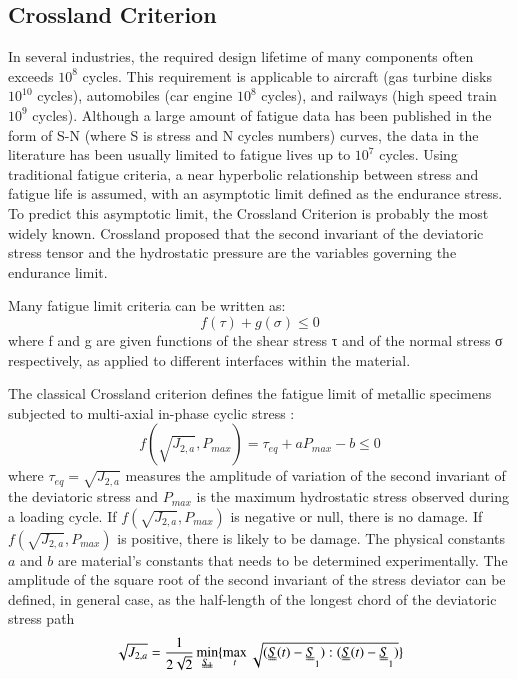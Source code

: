 \documentclass[3p,times,procedia,number]{elsarticle}
\begin{document}
\subsection{Crossland Criterion}
In several industries, the required design lifetime of many components often exceeds $ 10^8 $ cycles. This requirement is applicable to aircraft (gas turbine disks $ 10^{10} $ cycles), automobiles (car engine $ 10^8 $ cycles), and railways (high speed train $ 10^9 $ cycles). Although a large amount of fatigue data has been published in the form of S-N (where S is stress and N cycles numbers) curves, the data in the literature has been usually limited to fatigue lives up to $ 10^7 $ cycles. Using traditional fatigue criteria, a near hyperbolic relationship between stress and fatigue life is assumed, with an asymptotic limit defined as the endurance stress. To predict this asymptotic limit, the Crossland Criterion is probably the most widely known. Crossland proposed that the second invariant of the deviatoric stress tensor and the hydrostatic pressure are the variables governing the endurance limit. 

Many fatigue limit criteria can be written as:
\begin{equation}
	f(\tau)+g(\sigma) \leqslant 0
\end{equation}
where f and g are given functions of the shear stress τ and of the normal stress σ respectively, as applied to different interfaces within the material.  

The classical Crossland criterion defines the fatigue limit of metallic specimens subjected to multi-axial in-phase cyclic stress\cite{Crossland} : \begin{equation}f(\sqrt{J_{2,a}},P_{max})=\tau_{eq}+aP_{max}-b\leqslant 0\end{equation}
where $\tau_{eq}=\sqrt{J_{2,a}}$ measures  the amplitude of variation of the second invariant of the deviatoric stress  and $P_{max}$ is the maximum hydrostatic stress observed during a loading cycle. If $f(\sqrt{J_{2,a}},P_{max})$ is negative or null, there is no damage. If $f(\sqrt{J_{2,a}},P_{max})$ is positive, there is likely to be damage. The physical constants $a$ and $b$ are material's constants that needs to be determined experimentally. The amplitude of the square root of the second invariant of the stress deviator can be defined, in general case, as the half-length of the longest chord of the deviatoric stress path\cite{Papadopoulos1997219}
\begin{equation}\sqrt{J_{2,a}}=\frac{1}{2\sqrt{2}}\min \limits_{\uuline{S_1}}\{\max \limits_{t}\sqrt{(\uuline{S}(t)-\uuline{S}_1):(\uuline{S}(t)-\uuline{S}_1)}\}\end{equation}
\end{document}
